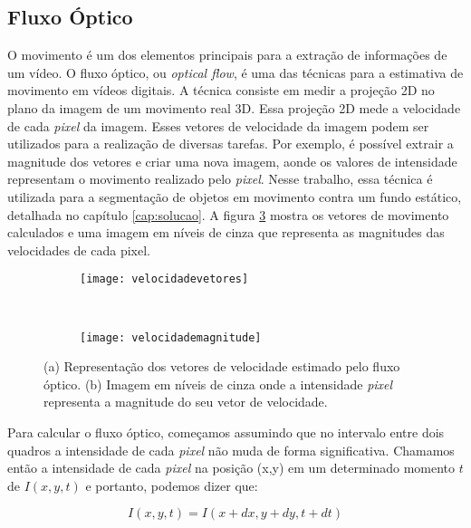 \subsection{Fluxo Óptico}\label{sec:fluxooptico}

O movimento é um dos elementos principais para a extração de informações de um vídeo. O fluxo óptico, ou \textit{optical flow}, é uma das técnicas para a estimativa de movimento em vídeos digitais. A técnica consiste em medir a projeção 2D no plano da imagem de um movimento real 3D\cite{mota2011tensor}. Essa projeção 2D mede a velocidade de cada \textit{pixel} da imagem. Esses vetores de velocidade da imagem podem ser utilizados para a realização de diversas tarefas. Por exemplo, é possível extrair a magnitude dos vetores e criar uma nova imagem, aonde os valores de intensidade representam o movimento realizado pelo \textit{pixel}. Nesse trabalho, essa técnica é utilizada para a segmentação de objetos em movimento contra um fundo estático, detalhada no capítulo \ref{cap:solucao}. A figura \ref{fig:fluxo} mostra os vetores de movimento calculados e uma imagem em níveis de cinza que representa as magnitudes das velocidades de cada pixel.

\begin{figure}
 \centering
\begin{subfigure}{.5\textwidth}
  \centering
  \texttt{[image: velocidadevetores]}
	\caption{}
	\label{fig:fluxo:sub:vetores}
\end{subfigure}\
\begin{subfigure}{.5\textwidth}
  \centering
  \texttt{[image: velocidademagnitude]}
	\caption{}
	\label{fig:fluxo:sub:magnitude}
\end{subfigure}
\caption{(a) Representação dos vetores de velocidade estimado pelo fluxo óptico. (b) Imagem em níveis de cinza onde a intensidade \textit{pixel} representa a magnitude do seu vetor de velocidade.}
\label{fig:fluxo}
\end{figure}

Para calcular o fluxo óptico, começamos assumindo que no intervalo entre dois quadros a intensidade de cada \textit{pixel} não muda de forma significativa. Chamamos então a intensidade de cada \textit{pixel} na posição (x,y) em um determinado momento $t$ de $I(x,y,t)$ e portanto, podemos dizer que: 

\begin{equation}
	I(x,y,t) = I(x+dx, y+dy, t+dt)
\label{eq:fluxo1}
\end{equation} 

